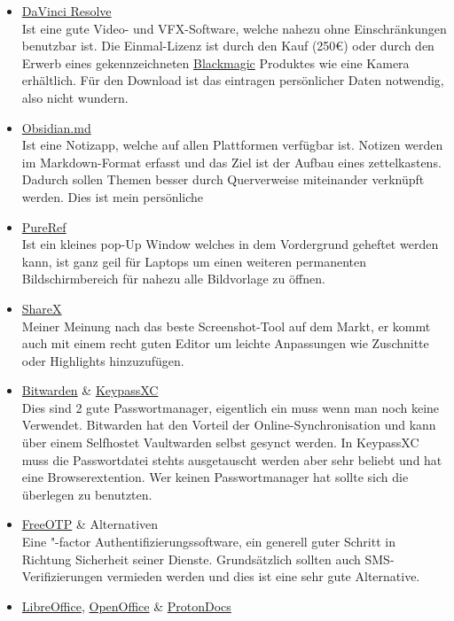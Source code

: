 \begin{itemize}
    \item \href{https://www.blackmagicdesign.com/de/products/davinciresolve}{DaVinci Resolve}\\
    Ist eine gute Video- und VFX-Software, welche nahezu ohne Einschränkungen benutzbar ist. Die Einmal-Lizenz ist durch den Kauf (250€) oder durch den Erwerb eines gekennzeichneten \href{https://www.blackmagicdesign.com/de/products}{Blackmagic} Produktes wie eine Kamera erhältlich. Für den Download ist das eintragen persönlicher Daten notwendig, also nicht wundern.
    \item \href{https://obsidian.md}{Obsidian.md}\\
    Ist eine Notizapp, welche auf allen Plattformen verfügbar ist. Notizen werden im Markdown-Format erfasst und das Ziel ist der Aufbau eines zettelkastens. Dadurch sollen Themen besser durch Querverweise miteinander verknüpft werden. Dies ist mein persönliche 
    \item \href{https://www.pureref.com/download.php}{PureRef}\\
    Ist ein kleines pop-Up Window welches in dem Vordergrund geheftet werden kann, ist ganz geil für Laptops um einen weiteren permanenten Bildschirmbereich für nahezu alle Bildvorlage zu öffnen.
    \item \href{https://getsharex.com/downloads}{ShareX}\\
    Meiner Meinung nach das beste Screenshot-Tool auf dem Markt, er kommt auch mit einem recht guten Editor um leichte Anpassungen wie Zuschnitte oder Highlights hinzuzufügen.
    \item \href{https://bitwarden.com/de-de/download/#downloads-desktop}{Bitwarden} \& \href{https://keepassxc.org/download/#windows}{KeypassXC}\\
    Dies sind 2 gute Passwortmanager, eigentlich ein muss wenn man noch keine Verwendet. Bitwarden hat den Vorteil der Online-Synchronisation und kann über einem Selfhostet Vaultwarden selbst gesynct werden. In KeypassXC muss die Passwortdatei stehts ausgetauscht werden aber sehr beliebt und hat eine Browserextention. Wer keinen Passwortmanager hat sollte sich die überlegen zu benutzten.
    \item \href{https://freeotp.github.io/}{FreeOTP} \& Alternativen\\
    Eine "-factor Authentifizierungssoftware, ein generell guter Schritt in Richtung Sicherheit seiner Dienste. Grundsätzlich sollten auch SMS-Verifizierungen vermieden werden und dies ist eine sehr gute Alternative.
    \item \href{https://de.libreoffice.org/download/download/}{LibreOffice}, \href{https://www.openoffice.org/de/download/}{OpenOffice} \& \href{https://proton.me/de/drive/docs}{ProtonDocs}\\

\end{itemize}
